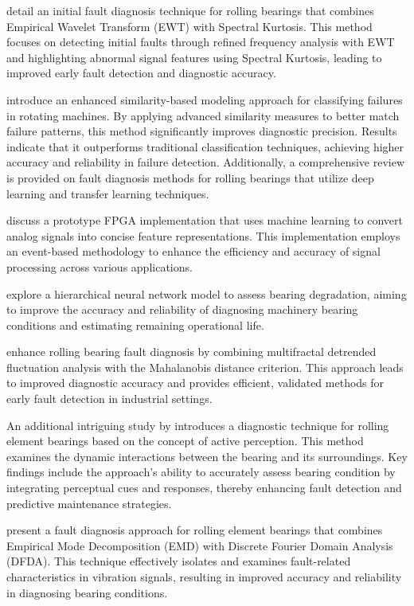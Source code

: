 \documentclass[sn-basic,pdflatex]{sn-jnl}
\theoremstyle{remark}
\theoremstyle{definition}
\begin{document}
\citet{WOS:000539546400083} detail an initial fault diagnosis technique
for rolling bearings that combines Empirical Wavelet Transform (EWT)
with Spectral Kurtosis. This method focuses on detecting initial faults
through refined frequency analysis with EWT and highlighting abnormal
signal features using Spectral Kurtosis, leading to improved early fault
detection and diagnostic accuracy.

\citet{hakim2023systematic} introduce an enhanced similarity-based
modeling approach for classifying failures in rotating machines. By
applying advanced similarity measures to better match failure patterns,
this method significantly improves diagnostic precision. Results
indicate that it outperforms traditional classification techniques,
achieving higher accuracy and reliability in failure detection.
Additionally, a comprehensive review is provided on fault diagnosis
methods for rolling bearings that utilize deep learning and transfer
learning techniques.

\citet{WOS:000345844100102} discuss a prototype FPGA implementation that
uses machine learning to convert analog signals into concise feature
representations. This implementation employs an event-based methodology
to enhance the efficiency and accuracy of signal processing across
various applications.

\citet{WOS:000396580800080} explore a hierarchical neural network model
to assess bearing degradation, aiming to improve the accuracy and
reliability of diagnosing machinery bearing conditions and estimating
remaining operational life.

\citet{WOS:000320835800016} enhance rolling bearing fault diagnosis by
combining multifractal detrended fluctuation analysis with the
Mahalanobis distance criterion. This approach leads to improved
diagnostic accuracy and provides efficient, validated methods for early
fault detection in industrial settings.

An additional intriguing study by \citet{WOS:000360994300029} introduces
a diagnostic technique for rolling element bearings based on the concept
of active perception. This method examines the dynamic interactions
between the bearing and its surroundings. Key findings include the
approach's ability to accurately assess bearing condition by integrating
perceptual cues and responses, thereby enhancing fault detection and
predictive maintenance strategies.

\citet{WOS:000343577703075} present a fault diagnosis approach for
rolling element bearings that combines Empirical Mode Decomposition
(EMD) with Discrete Fourier Domain Analysis (DFDA). This technique
effectively isolates and examines fault-related characteristics in
vibration signals, resulting in improved accuracy and reliability in
diagnosing bearing conditions.
\end{document}

